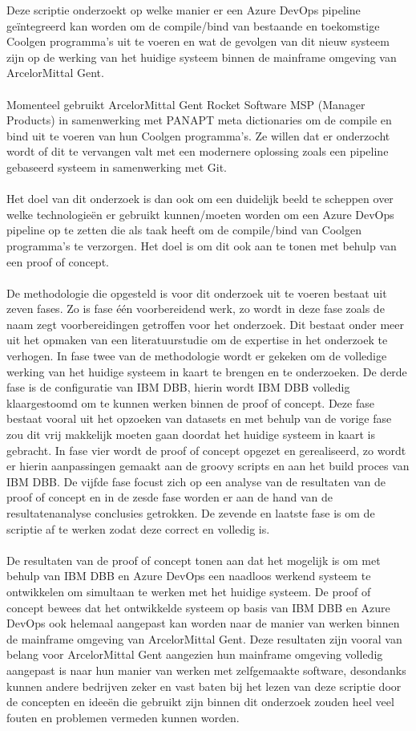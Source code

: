 Deze scriptie onderzoekt op welke manier er een Azure DevOps pipeline geïntegreerd kan worden om de compile/bind van bestaande en toekomstige Coolgen programma's uit te voeren en wat de gevolgen van dit nieuw systeem zijn op de werking van het huidige systeem binnen de mainframe omgeving van ArcelorMittal Gent. 
\\ \\
Momenteel gebruikt ArcelorMittal Gent Rocket Software MSP (Manager Products) in samenwerking met PANAPT meta dictionaries om de compile en bind uit te voeren van hun Coolgen programma's. Ze willen dat er onderzocht wordt of dit te vervangen valt met een modernere oplossing zoals een pipeline gebaseerd systeem in samenwerking met Git.
\\ \\
Het doel van dit onderzoek is dan ook om een duidelijk beeld te scheppen over welke technologieën er gebruikt kunnen/moeten worden om een Azure DevOps pipeline op te zetten die als taak heeft om de compile/bind van Coolgen programma's te verzorgen. Het doel is om dit ook aan te tonen met behulp van een proof of concept. 
\\ \\ 
De methodologie die opgesteld is voor dit onderzoek uit te voeren bestaat uit zeven fases. Zo is fase één voorbereidend werk, zo wordt in deze fase zoals de naam zegt voorbereidingen getroffen voor het onderzoek. Dit bestaat onder meer uit het opmaken van een literatuurstudie om de expertise in het onderzoek te verhogen. In fase twee van de methodologie wordt er gekeken om de volledige werking van het huidige systeem in kaart te brengen en te onderzoeken. De derde fase is de configuratie van IBM DBB, hierin wordt IBM DBB volledig klaargestoomd om te kunnen werken binnen de proof of concept. Deze fase bestaat vooral uit het opzoeken van datasets en met behulp van de vorige fase zou dit vrij makkelijk moeten gaan doordat het huidige systeem in kaart is gebracht. In fase vier wordt de proof of concept opgezet en gerealiseerd, zo wordt er hierin aanpassingen gemaakt aan de groovy scripts en aan het build proces van IBM DBB. De vijfde fase focust zich op een analyse van de resultaten van de proof of concept en in de zesde fase worden er aan de hand van de resultatenanalyse conclusies getrokken. De zevende en laatste fase is om de scriptie af te werken zodat deze correct en volledig is. 
\\ \\
De resultaten van de proof of concept tonen aan dat het mogelijk is om met behulp van IBM DBB en Azure DevOps een naadloos werkend systeem te ontwikkelen om simultaan te werken met het huidige systeem. De proof of concept bewees dat het ontwikkelde systeem op basis van IBM DBB en Azure DevOps ook helemaal aangepast kan worden naar de manier van werken binnen de mainframe omgeving van ArcelorMittal Gent. Deze resultaten zijn vooral van belang voor ArcelorMittal Gent aangezien hun mainframe omgeving volledig aangepast is naar hun manier van werken met zelfgemaakte software, desondanks kunnen andere bedrijven zeker en vast baten bij het lezen van deze scriptie door de concepten en ideeën die gebruikt zijn binnen dit onderzoek zouden heel veel fouten en problemen vermeden kunnen worden. 

